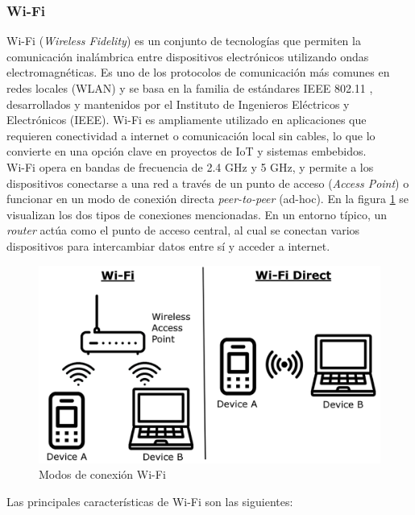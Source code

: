 \subsubsection{Wi-Fi}

Wi-Fi (\textit{Wireless Fidelity}) es un conjunto de tecnologías que permiten la comunicación inalámbrica entre dispositivos electrónicos utilizando ondas electromagnéticas. Es uno de los protocolos de comunicación más comunes en redes locales (WLAN) y se basa en la familia de estándares IEEE 802.11 \cite{ieee_802.11}, desarrollados y mantenidos por el Instituto de Ingenieros Eléctricos y Electrónicos (IEEE). Wi-Fi es ampliamente utilizado en aplicaciones que requieren conectividad a internet o comunicación local sin cables, lo que lo convierte en una opción clave en proyectos de IoT y sistemas embebidos. \\


Wi-Fi opera en bandas de frecuencia de 2.4 GHz y 5 GHz, y permite a los dispositivos conectarse a una red a través de un punto de acceso (\textit{Access Point}) o funcionar en un modo de conexión directa \textit{peer-to-peer} (ad-hoc). En la figura \ref{fig:wifi} se visualizan los dos tipos de conexiones mencionadas. En un entorno típico, un \textit{router} actúa como el punto de acceso central, al cual se conectan varios dispositivos para intercambiar datos entre sí y acceder a internet. \\ 

\begin{figure}[H]
    \centering
    \includegraphics[width = 0.7 \linewidth]{img/wifi.png}
    \caption{Modos de conexión Wi-Fi \cite{wifi_img}}
    \label{fig:wifi}
\end{figure}


Las principales características de Wi-Fi son las siguientes:

